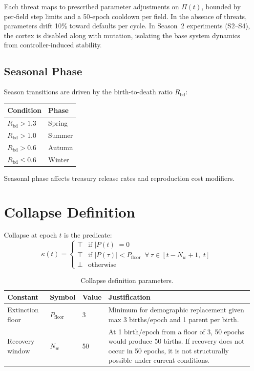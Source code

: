 \documentclass[11pt,a4paper]{article}
\begin{document}
Each threat maps to prescribed parameter adjustments on $\Pi(t)$, bounded by per-field step limits and a 50-epoch cooldown per field. In the absence of threats, parameters drift 10\% toward defaults per cycle. In Season~2 experiments (S2--S4), the cortex is disabled along with mutation, isolating the base system dynamics from controller-induced stability.

\subsection{Seasonal Phase}

Season transitions are driven by the birth-to-death ratio $R_{\text{bd}}$:

\begin{table}[H]
\centering
\small
\begin{tabular}{@{}ll@{}}
\toprule
Condition & Phase \\
\midrule
$R_{\text{bd}} > 1.3$ & Spring \\
$R_{\text{bd}} > 1.0$ & Summer \\
$R_{\text{bd}} > 0.6$ & Autumn \\
$R_{\text{bd}} \leq 0.6$ & Winter \\
\bottomrule
\end{tabular}
\end{table}

Seasonal phase affects treasury release rates and reproduction cost modifiers.

\section{Collapse Definition}

Collapse at epoch $t$ is the predicate:
\begin{equation}
  \kappa(t) = \begin{cases}
    \top & \text{if } |P(t)| = 0 \\
    \top & \text{if } |P(\tau)| < P_{\text{floor}} \;\;\forall\, \tau \in [t - N_w + 1,\; t] \\
    \bot & \text{otherwise}
  \end{cases}
\end{equation}

\begin{table}[H]
\centering
\caption{Collapse definition parameters.}
\begin{tabular}{@{}lllp{7.5cm}@{}}
\toprule
Constant & Symbol & Value & Justification \\
\midrule
Extinction floor & $P_{\text{floor}}$ & 3 & Minimum for demographic replacement given max 3 births/epoch and 1 parent per birth. \\
Recovery window & $N_w$ & 50 & At 1 birth/epoch from a floor of 3, 50 epochs would produce 50 births. If recovery does not occur in 50 epochs, it is not structurally possible under current conditions. \\
\bottomrule
\end{tabular}
\end{table}
\end{document}
